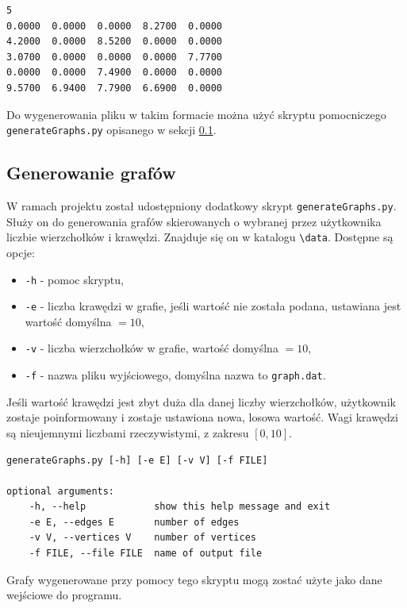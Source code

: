 \documentclass[12pt]{article}
\begin{document}
\begin{lstlisting}[caption={Przykładowy graf zapisany w odpowiednim formacie.}, captionpos=b ]
5
0.0000  0.0000  0.0000  8.2700  0.0000
4.2000  0.0000  8.5200  0.0000  0.0000
3.0700  0.0000  0.0000  0.0000  7.7700
0.0000  0.0000  7.4900  0.0000  0.0000
9.5700  6.9400  7.7900  6.6900  0.0000
\end{lstlisting}

Do wygenerowania pliku w takim formacie można użyć skryptu pomocniczego \lstinline|generateGraphs.py| opisanego w sekcji \ref{sec:gen_g}.

\subsection{Generowanie grafów} \label{sec:gen_g}
W ramach projektu został udostępniony dodatkowy skrypt  \lstinline|generateGraphs.py|. Służy on do generowania grafów skierowanych o wybranej przez użytkownika liczbie wierzchołków i krawędzi. Znajduje się on w katalogu \lstinline|\data|. Dostępne są opcje:
\begin{itemize}
\item \lstinline|-h| - pomoc skryptu,
\item \lstinline|-e| - liczba krawędzi w grafie, jeśli wartość nie została podana, ustawiana jest wartość domyślna $=10$,
\item \lstinline|-v| - liczba wierzchołków w grafie, wartość domyślna $=10$,
\item \lstinline|-f| - nazwa pliku wyjściowego, domyślna nazwa to \lstinline{graph.dat}.
\end{itemize}

Jeśli wartość krawędzi jest zbyt duża dla danej liczby wierzchołków, użytkownik zostaje poinformowany i zostaje ustawiona nowa, losowa wartość. Wagi krawędzi są nieujemnymi liczbami rzeczywistymi, z zakresu $[0, 10]$.

\begin{lstlisting}[caption={Pomoc skryptu \lstinline|generateGraphs.py|.}, captionpos=b ]
generateGraphs.py [-h] [-e E] [-v V] [-f FILE]

optional arguments:
	-h, --help            show this help message and exit
	-e E, --edges E       number of edges
	-v V, --vertices V    number of vertices
	-f FILE, --file FILE  name of output file
\end{lstlisting}

Grafy wygenerowane przy pomocy tego skryptu mogą zostać użyte jako dane wejściowe do programu.
\end{document}
